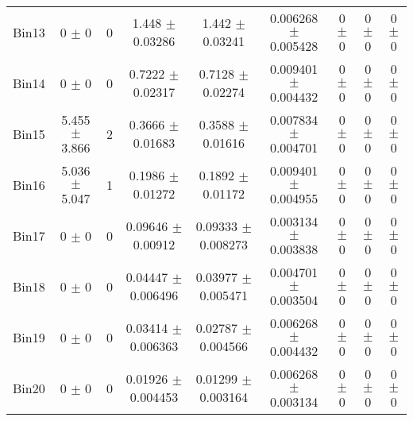 \begin{tabular}{@{\extracolsep{4pt}}lcccccccc@{}}
     Bin13 & 0 $\pm$ 0 & 0 & 1.448 $\pm$ 0.03286 & 1.442 $\pm$ 0.03241 & 0.006268 $\pm$ 0.005428 & 0 $\pm$ 0 & 0 $\pm$ 0 & 0 $\pm$ 0 \\ 
     Bin14 & 0 $\pm$ 0 & 0 & 0.7222 $\pm$ 0.02317 & 0.7128 $\pm$ 0.02274 & 0.009401 $\pm$ 0.004432 & 0 $\pm$ 0 & 0 $\pm$ 0 & 0 $\pm$ 0 \\ 
     Bin15 & 5.455 $\pm$ 3.866 & 2 & 0.3666 $\pm$ 0.01683 & 0.3588 $\pm$ 0.01616 & 0.007834 $\pm$ 0.004701 & 0 $\pm$ 0 & 0 $\pm$ 0 & 0 $\pm$ 0 \\ 
     Bin16 & 5.036 $\pm$ 5.047 & 1 & 0.1986 $\pm$ 0.01272 & 0.1892 $\pm$ 0.01172 & 0.009401 $\pm$ 0.004955 & 0 $\pm$ 0 & 0 $\pm$ 0 & 0 $\pm$ 0 \\ 
     Bin17 & 0 $\pm$ 0 & 0 & 0.09646 $\pm$ 0.00912 & 0.09333 $\pm$ 0.008273 & 0.003134 $\pm$ 0.003838 & 0 $\pm$ 0 & 0 $\pm$ 0 & 0 $\pm$ 0 \\ 
     Bin18 & 0 $\pm$ 0 & 0 & 0.04447 $\pm$ 0.006496 & 0.03977 $\pm$ 0.005471 & 0.004701 $\pm$ 0.003504 & 0 $\pm$ 0 & 0 $\pm$ 0 & 0 $\pm$ 0 \\ 
     Bin19 & 0 $\pm$ 0 & 0 & 0.03414 $\pm$ 0.006363 & 0.02787 $\pm$ 0.004566 & 0.006268 $\pm$ 0.004432 & 0 $\pm$ 0 & 0 $\pm$ 0 & 0 $\pm$ 0 \\ 
     Bin20 & 0 $\pm$ 0 & 0 & 0.01926 $\pm$ 0.004453 & 0.01299 $\pm$ 0.003164 & 0.006268 $\pm$ 0.003134 & 0 $\pm$ 0 & 0 $\pm$ 0 & 0 $\pm$ 0 \\ 
\hline\hline
  \end{tabular}
